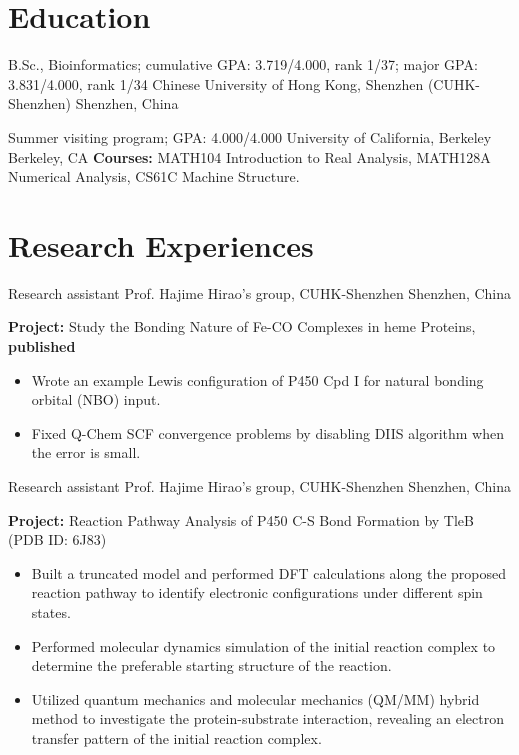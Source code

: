 \documentclass[11pt]{moderncv}
\begin{document}
\maketitle



\vspace{-3em}
\section{Education}
{B.Sc., Bioinformatics; cumulative GPA: 3.719/4.000, rank 1/37; major GPA: 3.831/4.000, rank 1/34}
{Chinese University of Hong Kong, Shenzhen (CUHK-Shenzhen)}
{Shenzhen, China}
{}
{}

{Summer visiting program; GPA: 4.000/4.000}
{University of California, Berkeley}
{Berkeley, CA}
{}
{\textbf{Courses:} MATH104 Introduction to Real Analysis, MATH128A Numerical Analysis, CS61C Machine Structure.}


\vspace{-0.75em}
\section{Research Experiences}
{Research assistant}
{Prof. Hajime Hirao's group, CUHK-Shenzhen}
{Shenzhen, China}
{}
{\textbf{Project:} Study the Bonding Nature of Fe-CO Complexes in heme Proteins, \textbf{published}
    \begin{itemize}\setlength\itemsep{-1pt}
        \item Wrote an example Lewis configuration of P450 Cpd I for natural bonding orbital (NBO) input.
        \item Fixed Q-Chem SCF convergence problems by disabling DIIS algorithm when the error is small.
    \end{itemize}
}

{Research assistant}
{Prof. Hajime Hirao's group, CUHK-Shenzhen}
{Shenzhen, China}
{}
{\textbf {Project:} Reaction Pathway Analysis of P450 C-S Bond Formation by TleB (PDB ID: 6J83)
    \begin{itemize}\setlength\itemsep{-1pt}
    \item Built a truncated model and performed DFT calculations along the proposed reaction pathway to identify electronic configurations under different spin states.
    \item Performed molecular dynamics simulation of the initial reaction complex to determine the preferable starting structure of the reaction.
    \item Utilized quantum mechanics and molecular mechanics (QM/MM) hybrid method to investigate the protein-substrate interaction, revealing an electron transfer pattern of the initial reaction complex.
\end{itemize}
}
\end{document}
